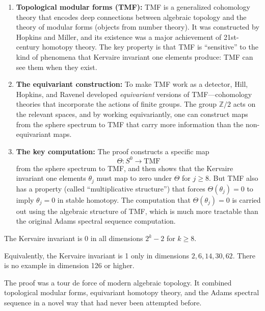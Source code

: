 \begin{enumerate}
\item \textbf{Topological modular forms (TMF):} TMF is a generalized cohomology theory that encodes deep connections between algebraic topology and the theory of modular forms (objects from number theory). It was constructed by Hopkins and Miller, and its existence was a major achievement of 21st-century homotopy theory. The key property is that TMF is ``sensitive'' to the kind of phenomena that Kervaire invariant one elements produce: TMF can see them when they exist.

\item \textbf{The equivariant construction:} To make TMF work as a detector, Hill, Hopkins, and Ravenel developed \emph{equivariant} versions of TMF---cohomology theories that incorporate the actions of finite groups. The group $\mathbb{Z}/2$ acts on the relevant spaces, and by working equivariantly, one can construct maps from the sphere spectrum to TMF that carry more information than the non-equivariant maps.

\item \textbf{The key computation:} The proof constructs a specific map
\[
\Theta: S^0 \to \mathrm{TMF}
\]
from the sphere spectrum to TMF, and then shows that the Kervaire invariant one elements $\theta_j$ must map to zero under $\Theta$ for $j \geq 8$. But TMF also has a property (called ``multiplicative structure'') that forces $\Theta(\theta_j) = 0$ to imply $\theta_j = 0$ in stable homotopy. The computation that $\Theta(\theta_j) = 0$ is carried out using the algebraic structure of TMF, which is much more tractable than the original Adams spectral sequence computation.
\end{enumerate}

\begin{theorem}
The Kervaire invariant is 0 in all dimensions $2^k - 2$ for $k \geq 8$.
\end{theorem}

Equivalently, the Kervaire invariant is 1 only in dimensions $2, 6, 14, 30, 62$. There is no example in dimension 126 or higher.

\begin{highlightbox}
The proof was a tour de force of modern algebraic topology. It combined topological modular forms, equivariant homotopy theory, and the Adams spectral sequence in a novel way that had never been attempted before.
\end{highlightbox}

